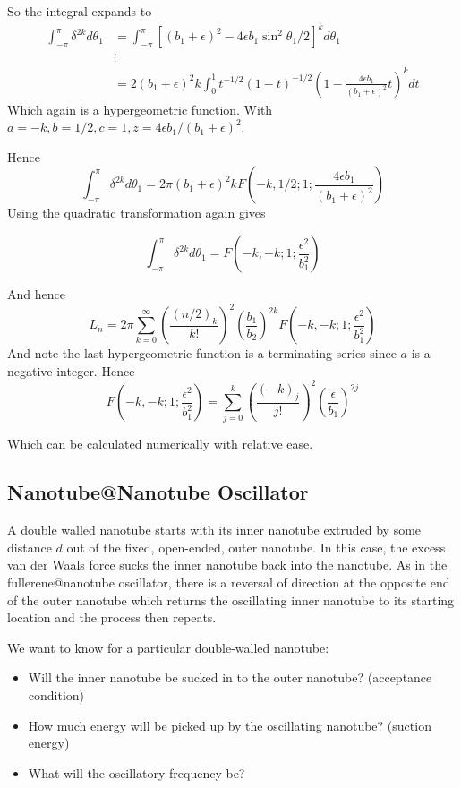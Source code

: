 \documentclass{X:/Documents/Coding/Latex/myassignment}
\begin{document}
So the integral expands to
\begin{align*}
	\int_{-\pi}^{\pi}\delta^{2k} d\theta_1 &= \int_{-\pi}^{\pi} \left[(b_1 + \epsilon)^2 - 4 \epsilon b_1 \sin^2 \theta_1/2\right]^k d\theta_1\\
	&\vdots\\
	&= 2(b_1 + \epsilon)^2k \int_0^1 t^{-1/2}(1-t)^{-1/2} \left(1- \frac{4 \epsilon b_1}{(b_1 + \epsilon)^2} t\right)^k dt
\end{align*}
Which again is a hypergeometric function. With $a=-k, b=1/2, c=1, z = 4 \epsilon b_1/(b_1 + \epsilon)^2$.

Hence
\[\int_{-\pi}^{\pi}\delta^{2k} d\theta_1  = 2\pi (b_1+\epsilon)^2k F(-k,1/2;1; \frac{4 \epsilon b_1}{(b_1+ \epsilon)^2})\]
Using the quadratic transformation again gives

\[\int_{-\pi}^{\pi}\delta^{2k} d\theta_1  = F(-k,-k;1; \frac{\epsilon^2}{b_1^2})\]

And hence
\[L_n = 2\pi \sum_{k=0}^{\infty} \left(\frac{(n/2)_k}{k!}\right)^2 \left(\frac{b_1}{b_2}\right)^{2k} F(-k,-k;1; \frac{\epsilon^2}{b_1^2})\]
And note the last hypergeometric function is a terminating series since $a$ is a negative integer. Hence
\[F\left(-k,-k;1;\frac{\epsilon^2}{b_1^2}\right) = \sum_{j=0}^k \left(\frac{(-k)_j}{j!}\right)^2 \left(\frac{\epsilon}{b_1}\right)^{2j}\]

Which can be calculated numerically with relative ease.

\subsection{Nanotube@Nanotube Oscillator}

A double walled nanotube starts with its inner nanotube extruded by some distance $d$ out of the fixed, open-ended, outer nanotube. In this case, the excess van der Waals force sucks the inner nanotube back into the nanotube. As in the fullerene@nanotube oscillator, there is a reversal of direction at the opposite end of the outer nanotube which returns the oscillating inner nanotube to its starting location and the process then repeats.

We want to know for a particular double-walled nanotube:
\begin{itemize}
	\item Will the inner nanotube be sucked in to the outer nanotube? (acceptance condition)
	\item How much energy will be picked up by the oscillating nanotube? (suction energy)
	\item What will the oscillatory frequency be?
\end{itemize}
\end{document}
